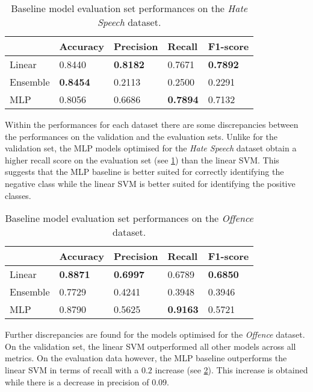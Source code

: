 \begin{table}[h]
  \centering
  \begin{tabular}{l|llll}
             & Accuracy        & Precision       & Recall          & F1-score        \\\hline
    Linear   & 0.8440          & \textbf{0.8182} & 0.7671          & \textbf{0.7892} \\
    Ensemble & \textbf{0.8454} & 0.2113          & 0.2500          & 0.2291          \\
    MLP      & 0.8056          & 0.6686          & \textbf{0.7894} & 0.7132
  \end{tabular}
  \caption{Baseline model evaluation set performances on the \textit{Hate Speech} dataset.}
  \label{tab:baseline_test_wh}
\end{table}

Within the performances for each dataset there are some discrepancies between the performances on the validation and the evaluation sets.
Unlike for the validation set, the MLP models optimised for the \textit{Hate Speech} dataset obtain a higher recall score on the evaluation set (see \cref{tab:baseline_test_wh}) than the linear SVM.
This suggests that the MLP baseline is better suited for correctly identifying the negative class while the linear SVM is better suited for identifying the positive classes.

\begin{table}[h]
  \centering
  \begin{tabular}{l|llll}
             & Accuracy        & Precision       & Recall          & F1-score        \\\hline
    Linear   & \textbf{0.8871} & \textbf{0.6997} & 0.6789          & \textbf{0.6850} \\
    Ensemble & 0.7729          & 0.4241          & 0.3948          & 0.3946          \\
    MLP      & 0.8790          & 0.5625          & \textbf{0.9163} & 0.5721
  \end{tabular}
  \caption{Baseline model evaluation set performances on the \textit{Offence} dataset.}
  \label{tab:baseline_test_davidson}
\end{table}

Further discrepancies are found for the models optimised for the \textit{Offence} dataset.
On the validation set, the linear SVM outperformed all other models across all metrics.
On the evaluation data however, the MLP baseline outperforms the linear SVM in terms of recall with a $0.2$ increase (see \cref{tab:baseline_test_davidson}).
This increase is obtained while there is a decrease in precision of $0.09$.

